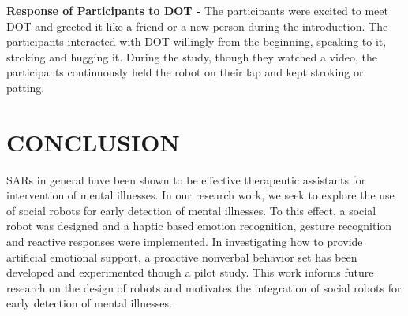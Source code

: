 \documentclass[letterpaper, 10 pt, conference]{ieeeconf}  %
\begin{document}
\textbf{Response of Participants to DOT -} The participants were excited to meet DOT and greeted it like a friend or a new person during the introduction. The participants interacted with DOT willingly from the beginning, speaking to it, stroking and hugging it. During the study, though they watched a video, the participants continuously
held the robot on their lap and kept stroking or patting.

\section{CONCLUSION}
SARs in general have been shown to be effective therapeutic assistants for intervention of mental illnesses. In our research work, we seek to explore the use of social robots for early detection of mental
illnesses. To this effect, a social robot was designed and a haptic based emotion recognition, gesture recognition and reactive responses were implemented. In investigating how to provide artificial emotional support, a proactive nonverbal behavior set has been developed and experimented though a pilot study. This work informs future research on the design of robots and motivates the integration of social robots for early detection of mental illnesses.




\end{document}
